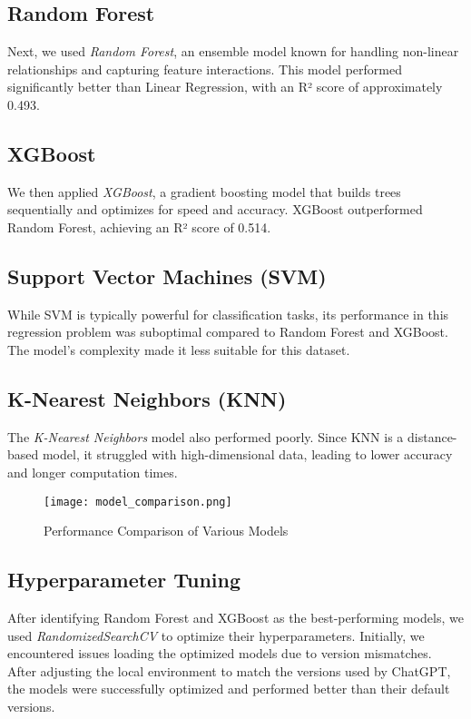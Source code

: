 \documentclass{article}
\begin{document}
\subsection{Random Forest}
Next, we used \textit{Random Forest}, an ensemble model known for handling non-linear relationships and capturing feature interactions. This model performed significantly better than Linear Regression, with an R² score of approximately 0.493.

\subsection{XGBoost}
We then applied \textit{XGBoost}, a gradient boosting model that builds trees sequentially and optimizes for speed and accuracy. XGBoost outperformed Random Forest, achieving an R² score of 0.514.

\subsection{Support Vector Machines (SVM)}
While SVM is typically powerful for classification tasks, its performance in this regression problem was suboptimal compared to Random Forest and XGBoost. The model’s complexity made it less suitable for this dataset.

\subsection{K-Nearest Neighbors (KNN)}
The \textit{K-Nearest Neighbors} model also performed poorly. Since KNN is a distance-based model, it struggled with high-dimensional data, leading to lower accuracy and longer computation times.

\begin{figure}[h]
    \centering
    \texttt{[image: model\_comparison.png]}
    \caption{Performance Comparison of Various Models}
\end{figure}

\subsection{Hyperparameter Tuning}
After identifying Random Forest and XGBoost as the best-performing models, we used \textit{RandomizedSearchCV} to optimize their hyperparameters. Initially, we encountered issues loading the optimized models due to version mismatches. After adjusting the local environment to match the versions used by ChatGPT, the models were successfully optimized and performed better than their default versions.
\end{document}
